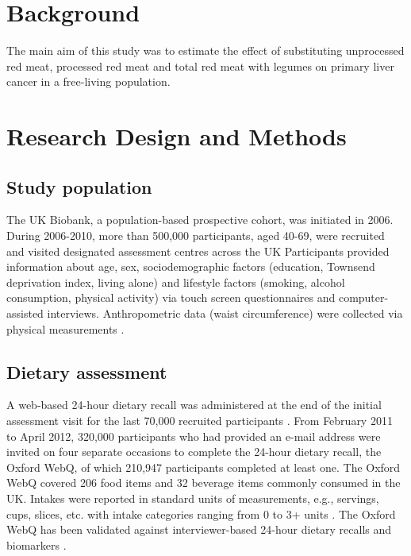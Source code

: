 \documentclass[sn-basic,Numbered,pdflatex]{sn-jnl}
\begin{document}



\maketitle

\hypertarget{sec1}{%
\section{Background}\label{sec1}}

The main aim of this study was to estimate the effect of substituting
unprocessed red meat, processed red meat and total red meat with legumes
on primary liver cancer in a free-living population.

\hypertarget{sec2}{%
\section{Research Design and Methods}\label{sec2}}

\hypertarget{subsec1}{%
\subsection{Study population}\label{subsec1}}

The UK Biobank, a population-based prospective cohort, was initiated in
2006. \citep{sudlow2015} During 2006-2010, more than 500,000 participants,
aged 40-69, were recruited and visited designated assessment centres
across the UK Participants provided information about age, sex,
sociodemographic factors (education, Townsend deprivation index, living
alone) and lifestyle factors (smoking, alcohol consumption, physical
activity) via touch screen questionnaires and computer-assisted
interviews. Anthropometric data (waist circumference) were collected via
physical measurements \citep{RN113}.

\hypertarget{subsec2}{%
\subsection{Dietary assessment}\label{subsec2}}

A web-based 24-hour dietary recall was administered at the end of the
initial assessment visit for the last 70,000 recruited participants
\citep{RN115}. From February 2011 to April 2012, 320,000 participants who had
provided an e-mail address were invited on four separate occasions to
complete the 24-hour dietary recall, the Oxford WebQ, of which 210,947
participants completed at least one. The Oxford WebQ covered 206 food
items and 32 beverage items commonly consumed in the UK. Intakes were
reported in standard units of measurements, e.g., servings, cups,
slices, etc. with intake categories ranging from 0 to 3+ units
\citep{piernas2021}. The Oxford WebQ has been validated against
interviewer-based 24-hour dietary recalls and biomarkers \citep{Liu2011, Greenwood2019}.
\end{document}
